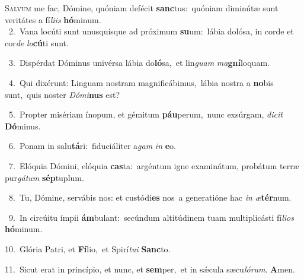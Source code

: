 \lettrine{\initial\textcolor{\initialcolor}{S}}{alvum} me fac, Dómine, quóniam defécit \textbf{sanc}\-tus:~\star quóniam diminútæ sunt veritátes a fí\-\textit{li}\-\textit{is} \textbf{hó}\-minum.\\
{\numbfont\textcolor{\numbcolor}{~2.}}~Vana locúti sunt unusquísque ad próximum \textbf{su}\-um:~\star lábia dolósa, in corde et cor\textit{de} \textit{lo}\-\textbf{cú}ti sunt.\par
{\numbfont\textcolor{\numbcolor}{~3.}}~Dispérdat Dóminus univérsa lábia do\-\textbf{ló}\-sa,~\star et lin\textit{guam} \textit{ma}\-\textbf{gní}loquam.\par
{\numbfont\textcolor{\numbcolor}{~4.}}~Qui dixérunt: Linguam nostram magnificábimus,~\dagger lábia nostra a \textbf{no}\-bis sunt,~\star quis noster \textit{Dó}\-\textit{mi}\textbf{nus} est?\par
{\numbfont\textcolor{\numbcolor}{~5.}}~Propter misériam ínopum, et gémitum \textbf{páu}\-perum,~\star nunc exsúrgam, \textit{di}\-\textit{cit} \textbf{Dó}\-minus.\par
{\numbfont\textcolor{\numbcolor}{~6.}}~Ponam in salu\-\textbf{tá}\-ri:~\star fiduciáliter a\textit{gam} \textit{in} \textbf{e}\-o.\par
{\numbfont\textcolor{\numbcolor}{~7.}}~Elóquia Dómini, elóquia \textbf{cas}\-ta:~\star argéntum igne examinátum, probátum terræ pur\-\textit{gá}\-\textit{tum} \textbf{sép}\-tuplum.\par
{\numbfont\textcolor{\numbcolor}{~8.}}~Tu, Dómine, servábis nos: et custódi\textbf{es} nos~\star a generatióne hac \textit{in} \textit{æ}\-\textbf{tér}num.\par
{\numbfont\textcolor{\numbcolor}{~9.}}~In circúitu ímpii \textbf{ám}\-bulant:~\star secúndum altitúdinem tuam multiplicásti fí\-\textit{li}\-\textit{os} \textbf{hó}\-minum.\par
{\numbfont\textcolor{\numbcolor}{10.}}~Glória Patri, et \textbf{Fí}\-lio,~\star et Spirí\-\textit{tu}\-\textit{i} \textbf{Sanc}\-to.\par
{\numbfont\textcolor{\numbcolor}{11.}}~Sicut erat in princípio, et nunc, et \textbf{sem}\-per,~\star et in sǽcula sæcu\-\textit{ló}\-\textit{rum}. \textbf{A}\-men.\par
